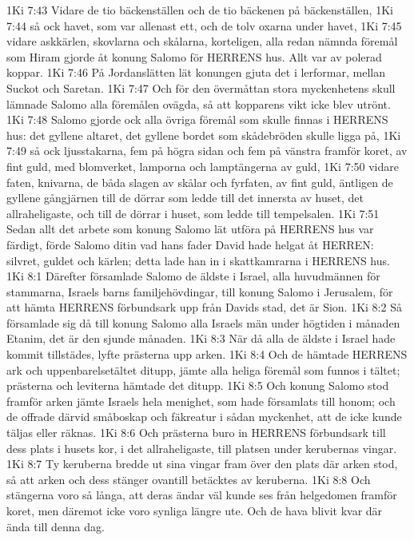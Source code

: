 1Ki 7:43  Vidare de tio bäckenställen och de tio bäckenen på bäckenställen,
1Ki 7:44  så ock havet, som var allenast ett, och de tolv oxarna under havet,
1Ki 7:45  vidare askkärlen, skovlarna och skålarna, korteligen, alla redan nämnda föremål som Hiram gjorde åt konung Salomo för HERRENS hus. Allt var av polerad koppar.
1Ki 7:46  På Jordanslätten lät konungen gjuta det i lerformar, mellan Suckot och Saretan.
1Ki 7:47  Och för den övermåttan stora myckenhetens skull lämnade Salomo alla föremålen ovägda, så att kopparens vikt icke blev utrönt.
1Ki 7:48  Salomo gjorde ock alla övriga föremål som skulle finnas i HERRENS hus: det gyllene altaret, det gyllene bordet som skådebröden skulle ligga på,
1Ki 7:49  så ock ljusstakarna, fem på högra sidan och fem på vänstra framför koret, av fint guld, med blomverket, lamporna och lamptängerna av guld,
1Ki 7:50  vidare faten, knivarna, de båda slagen av skålar och fyrfaten, av fint guld, äntligen de gyllene gångjärnen till de dörrar som ledde till det innersta av huset, det allraheligaste, och till de dörrar i huset, som ledde till tempelsalen.
1Ki 7:51  Sedan allt det arbete som konung Salomo lät utföra på HERRENS hus var färdigt, förde Salomo ditin vad hans fader David hade helgat åt HERREN: silvret, guldet och kärlen; detta lade han in i skattkamrarna i HERRENS hus.
1Ki 8:1  Därefter församlade Salomo de äldste i Israel, alla huvudmännen för stammarna, Israels barns familjehövdingar, till konung Salomo i Jerusalem, för att hämta HERRENS förbundsark upp från Davids stad, det är Sion.
1Ki 8:2  Så församlade sig då till konung Salomo alla Israels män under högtiden i månaden Etanim, det är den sjunde månaden.
1Ki 8:3  När då alla de äldste i Israel hade kommit tillstädes, lyfte prästerna upp arken.
1Ki 8:4  Och de hämtade HERRENS ark och uppenbarelsetältet ditupp, jämte alla heliga föremål som funnos i tältet; prästerna och leviterna hämtade det ditupp.
1Ki 8:5  Och konung Salomo stod framför arken jämte Israels hela menighet, som hade församlats till honom; och de offrade därvid småboskap och fäkreatur i sådan myckenhet, att de icke kunde täljas eller räknas.
1Ki 8:6  Och prästerna buro in HERRENS förbundsark till dess plats i husets kor, i det allraheligaste, till platsen under kerubernas vingar.
1Ki 8:7  Ty keruberna bredde ut sina vingar fram över den plats där arken stod, så att arken och dess stänger ovantill betäcktes av keruberna.
1Ki 8:8  Och stängerna voro så långa, att deras ändar väl kunde ses från helgedomen framför koret, men däremot icke voro synliga längre ute. Och de hava blivit kvar där ända till denna dag.
